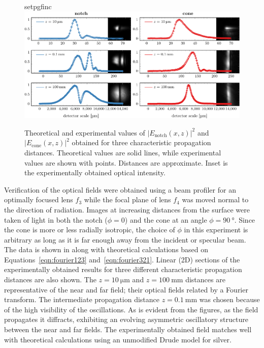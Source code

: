 \begin{figure}[ht]
 \centering
 {setpgfinc}
 \includegraphics[width=16cm,keepaspectratio]{interference/figures/fig2-crop.pdf}
\caption{Theoretical and experimental values of
$|E_\text{notch}(x,z)|^2$ and $|E_\text{cone}(x,z)|^2$ obtained for three
characteristic propagation distances.  Theoretical values are solid lines,
while experimental values are shown with points.  Distances are
approximate.  Inset is the experimentally obtained optical intensity.}
\label{fig:fresnelprop}
\end{figure}
Verification of the optical fields were obtained using a beam profiler for
an optimally focused lens $f_3$ while the focal plane of lens $f_4$ was moved normal
to the direction of radiation.  Images at increasing distances from the
surface were taken of light in both the notch
($\phi=0$) and the cone at an angle $\phi = \SI{90}{\degree}$.  Since the
cone is more or less radially isotropic, the choice of $\phi$ in this
experiment is arbitrary as long as it is far enough away from the incident
or specular beam.  The data is shown in  along with 
theoretical calculations based on Equations~\ref{eqn:fourier123} and~\ref{eqn:fourier321}. Linear (2D) sections of the experimentally obtained results for
three different characteristic propagation distances are also shown.  
The $z=\SI{10}{\micro\meter}$ and $z=\SI{100}{\milli\meter}$ distances
are representative of the near and far field; their optical fields 
related by a Fourier transform.  The intermediate propagation
distance $z=\SI{0.1}{\milli\meter}$ was chosen because of the high visibility of the oscillations.  As is evident from the figures, as the field propagates it
diffracts, exhibiting an evolving asymmetric oscillatory structure between
the near and far fields.  The experimentally obtained field matches well with
theoretical calculations using an unmodified Drude model for silver.

